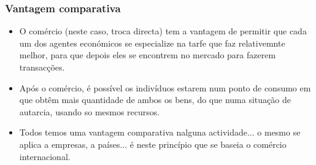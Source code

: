 \begin{frame}
	\frametitle{Vantagem comparativa}
	\begin{itemize}
		\item O com\'ercio (neste caso, troca directa) tem a vantagem de permitir que cada um dos agentes econ\'omicos se especialize na tarfe que faz relativemnte melhor, para que depois eles se encontrem no mercado para fazerem transac\c c\~oes.
		\item Ap\'os o com\'ercio, \'e poss\'ivel os indiv\'iduos estarem num ponto de consumo em que obt\^em mais quantidade de ambos os bens, do que numa situa\c c\~ao de autarcia, usando so mesmos recursos.

		\item Todos temos uma vantagem comparativa nalguna actividade... o mesmo se aplica a empresas, a pa\'ises... \'e neste princ\'ipio que se baseia o com\'ercio internacional.
	\end{itemize}
\end{frame}